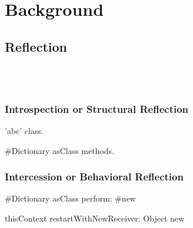 
\chapter{Background}
\minitoc
\introduction

\newpage
\section{Reflection}
\\
\\
\subsection{Introspection or Structural Reflection}
\begin{stcode}{}
'abc' class.
\end{stcode}
\begin{stcode}{}
#Dictionary asClass methods.
\end{stcode}


\subsection{Intercession or Behavioral Reflection}
\begin{stcode}{}
#Dictionary asClass perform: #new
\end{stcode}
\begin{stcode}{}
thisContext restartWithNewReceiver: Object new 
\end{stcode}

